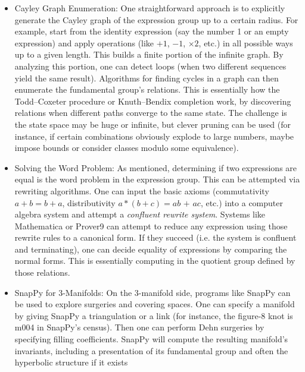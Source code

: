 \documentclass[11pt]{article}
\theoremstyle{remark}
\begin{document}
\begin{itemize}
\item Cayley Graph Enumeration: One straightforward approach is to explicitly generate the Cayley graph of the expression group up to a certain radius. For example, start from the identity expression (say the number 1 or an empty expression) and apply operations (like $+1$, $-1$, $\times 2$, etc.) in all possible ways up to a given length. This builds a finite portion of the infinite graph. By analyzing this portion, one can detect loops (when two different sequences yield the same result). Algorithms for finding cycles in a graph can then enumerate the fundamental group’s relations. This is essentially how the Todd–Coxeter procedure or Knuth–Bendix completion work, by discovering relations when different paths converge to the same state. The challenge is the state space may be huge or infinite, but clever pruning can be used (for instance, if certain combinations obviously explode to large numbers, maybe impose bounds or consider classes modulo some equivalence).


\item Solving the Word Problem: As mentioned, determining if two expressions are equal is the word problem in the expression group. This can be attempted via rewriting algorithms. One can input the basic axioms (commutativity $a+b = b+a$, distributivity $a*(b+c)=a\textit{b + a}c$, etc.) into a computer algebra system and attempt a \textit{confluent rewrite system}. Systems like Mathematica or Prover9 can attempt to reduce any expression using those rewrite rules to a canonical form. If they succeed (i.e. the system is confluent and terminating), one can decide equality of expressions by comparing the normal forms. This is essentially computing in the quotient group defined by those relations.


\item SnapPy for 3-Manifolds: On the 3-manifold side, programs like SnapPy can be used to explore surgeries and covering spaces. One can specify a manifold by giving SnapPy a triangulation or a link (for instance, the figure-8 knot is m004 in SnapPy’s census). Then one can perform Dehn surgeries by specifying filling coefficients. SnapPy will compute the resulting manifold’s invariants, including a presentation of its fundamental group and often the hyperbolic structure if it exists


\end{itemize}
\end{document}
